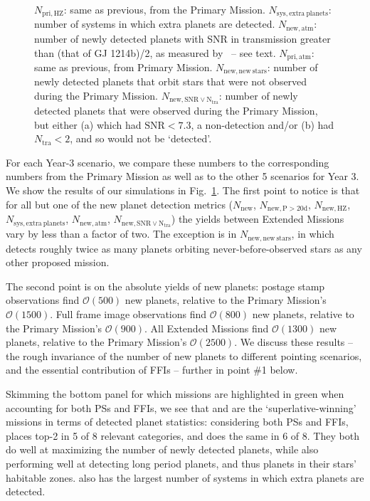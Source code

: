 \begin{figure}[!t]
{	$N_\mathrm{pri,HZ}$: same as previous, from the Primary Mission.
	$N_\mathrm{sys,extra\ planets}$: number of systems in which extra planets are detected.
	$N_\mathrm{new,atm}$: number of newly detected planets with SNR in transmission greater than (that of GJ 1214b)/2, as measured by \jwst\ -- see text.
	$N_\mathrm{pri,atm}$: same as previous, from Primary Mission.
	$N_\mathrm{new,new\ stars}$: number of newly detected planets that orbit stars that were not observed during the Primary Mission.
	$N_\mathrm{new,SNR\lor N_{tra}}$: number of newly detected planets that were observed during the Primary Mission, but either (a) which had $\mathrm{SNR}<7.3$, a non-detection and/or (b) had $N_\mathrm{tra}<2$, and so would not be `detected'.}
	\label{fig:yield_results}
\end{figure}

For each Year-3 scenario, we compare these numbers to the
corresponding numbers from the Primary Mission as well as to the other
5 scenarios for Year 3. We show the results of our simulations in
Fig.~\ref{fig:yield_results}.  The first point to notice is that for
all but one of the new planet detection metrics ($N_\mathrm{new}$,
$N_\mathrm{new,P>20d}$, $N_\mathrm{new,HZ}$,
$N_\mathrm{sys,extra\ planets}$, $N_\mathrm{new,atm}$,
$N_\mathrm{new,SNR\lor N_{tra}}$) the yields between Extended Missions
vary by less than a factor of two.  The exception is in
$N_\mathrm{new,new\ stars}$, in which \elong\:detects roughly twice as
many planets orbiting never-before-observed stars as any other
proposed mission.

The second point is on the absolute yields of new planets: postage stamp observations find $\mathcal{O}(500)$ new planets, relative to the Primary Mission's $\mathcal{O}(1500)$.
Full frame image observations find $\mathcal{O}(800)$ new planets, relative to the Primary Mission's $\mathcal{O}(900)$.
All Extended Missions find $\mathcal{O}(1300)$ new planets, relative to the Primary Mission's $\mathcal{O}(2500)$.
We discuss these results -- the rough invariance of the number of new planets to different pointing scenarios, and the essential contribution of FFIs -- further in point \#1 below.

Skimming the bottom panel for which missions are highlighted in green when accounting for both PSs and FFIs, we see that \npole\:and \hemis\:are the `superlative-winning' missions in terms of detected planet statistics: considering both PSs and FFIs, \npole\:places top-2 in 5 of 8 relevant categories, and \hemis\:does the same in 6 of 8.
They both do well at maximizing the number of newly detected planets, while also performing well at detecting long period planets, and thus planets in their stars' habitable zones.
\hemis\:also has the largest number of systems in which extra planets are detected.

